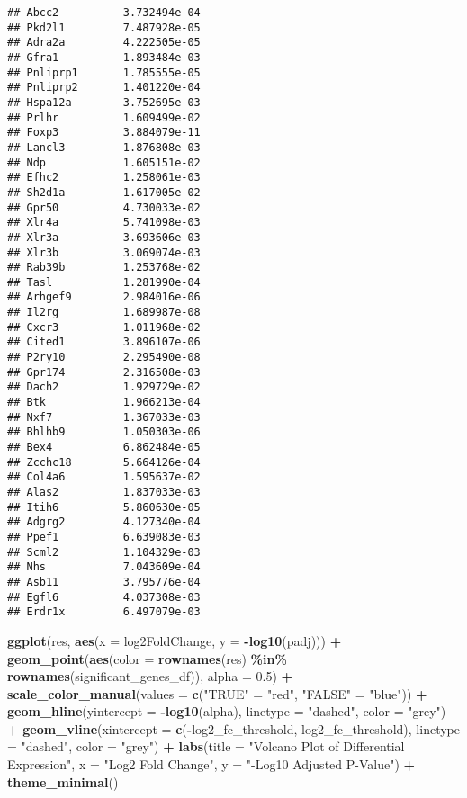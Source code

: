 \documentclass[
]{article}
\newenvironment{Shaded}{\begin{snugshade}}{\end{snugshade}}
\newcommand{\AttributeTok}[1]{\textcolor[rgb]{0.13,0.29,0.53}{#1}}
\newcommand{\FloatTok}[1]{\textcolor[rgb]{0.00,0.00,0.81}{#1}}
\newcommand{\FunctionTok}[1]{\textcolor[rgb]{0.13,0.29,0.53}{\textbf{#1}}}
\newcommand{\NormalTok}[1]{#1}
\newcommand{\OtherTok}[1]{\textcolor[rgb]{0.56,0.35,0.01}{#1}}
\newcommand{\SpecialCharTok}[1]{\textcolor[rgb]{0.81,0.36,0.00}{\textbf{#1}}}
\newcommand{\StringTok}[1]{\textcolor[rgb]{0.31,0.60,0.02}{#1}}
\begin{document}
\begin{verbatim}
## Abcc2          3.732494e-04
## Pkd2l1         7.487928e-05
## Adra2a         4.222505e-05
## Gfra1          1.893484e-03
## Pnliprp1       1.785555e-05
## Pnliprp2       1.401220e-04
## Hspa12a        3.752695e-03
## Prlhr          1.609499e-02
## Foxp3          3.884079e-11
## Lancl3         1.876808e-03
## Ndp            1.605151e-02
## Efhc2          1.258061e-03
## Sh2d1a         1.617005e-02
## Gpr50          4.730033e-02
## Xlr4a          5.741098e-03
## Xlr3a          3.693606e-03
## Xlr3b          3.069074e-03
## Rab39b         1.253768e-02
## Tasl           1.281990e-04
## Arhgef9        2.984016e-06
## Il2rg          1.689987e-08
## Cxcr3          1.011968e-02
## Cited1         3.896107e-06
## P2ry10         2.295490e-08
## Gpr174         2.316508e-03
## Dach2          1.929729e-02
## Btk            1.966213e-04
## Nxf7           1.367033e-03
## Bhlhb9         1.050303e-06
## Bex4           6.862484e-05
## Zcchc18        5.664126e-04
## Col4a6         1.595637e-02
## Alas2          1.837033e-03
## Itih6          5.860630e-05
## Adgrg2         4.127340e-04
## Ppef1          6.639083e-03
## Scml2          1.104329e-03
## Nhs            7.043609e-04
## Asb11          3.795776e-04
## Egfl6          4.037308e-03
## Erdr1x         6.497079e-03
\end{verbatim}

\begin{Shaded}
\begin{Highlighting}[]
  \FunctionTok{ggplot}\NormalTok{(res, }\FunctionTok{aes}\NormalTok{(}\AttributeTok{x =}\NormalTok{ log2FoldChange, }\AttributeTok{y =} \SpecialCharTok{{-}}\FunctionTok{log10}\NormalTok{(padj))) }\SpecialCharTok{+}
  \FunctionTok{geom\_point}\NormalTok{(}\FunctionTok{aes}\NormalTok{(}\AttributeTok{color =} \FunctionTok{rownames}\NormalTok{(res) }\SpecialCharTok{\%in\%} \FunctionTok{rownames}\NormalTok{(significant\_genes\_df)), }\AttributeTok{alpha =} \FloatTok{0.5}\NormalTok{) }\SpecialCharTok{+}
  \FunctionTok{scale\_color\_manual}\NormalTok{(}\AttributeTok{values =} \FunctionTok{c}\NormalTok{(}\StringTok{"TRUE"} \OtherTok{=} \StringTok{"red"}\NormalTok{, }\StringTok{"FALSE"} \OtherTok{=} \StringTok{"blue"}\NormalTok{)) }\SpecialCharTok{+}
  \FunctionTok{geom\_hline}\NormalTok{(}\AttributeTok{yintercept =} \SpecialCharTok{{-}}\FunctionTok{log10}\NormalTok{(alpha), }\AttributeTok{linetype =} \StringTok{"dashed"}\NormalTok{, }\AttributeTok{color =} \StringTok{"grey"}\NormalTok{) }\SpecialCharTok{+}
  \FunctionTok{geom\_vline}\NormalTok{(}\AttributeTok{xintercept =} \FunctionTok{c}\NormalTok{(}\SpecialCharTok{{-}}\NormalTok{log2\_fc\_threshold, log2\_fc\_threshold), }\AttributeTok{linetype =} \StringTok{"dashed"}\NormalTok{, }\AttributeTok{color =} \StringTok{"grey"}\NormalTok{) }\SpecialCharTok{+}
  \FunctionTok{labs}\NormalTok{(}\AttributeTok{title =} \StringTok{"Volcano Plot of Differential Expression"}\NormalTok{, }\AttributeTok{x =} \StringTok{"Log2 Fold Change"}\NormalTok{, }\AttributeTok{y =} \StringTok{"{-}Log10 Adjusted P{-}Value"}\NormalTok{) }\SpecialCharTok{+}
  \FunctionTok{theme\_minimal}\NormalTok{()}
\end{Highlighting}
\end{Shaded}
\end{document}
